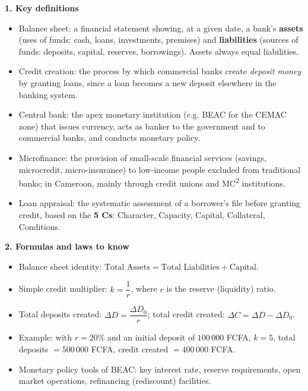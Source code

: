 \documentclass[11pt]{article}
\newcommand{\cle}[1]{{\popxbold\color{popdark}#1}}
\begin{document}
\begin{bilan}
\textbf{1. Key definitions}
\begin{itemize}
\item \cle{Balance sheet}: a financial statement showing, at a given date, a bank's \textbf{assets} (uses of funds: cash, loans, investments, premises) and \textbf{liabilities} (sources of funds: deposits, capital, reserves, borrowings). Assets always equal liabilities.
\item \cle{Credit creation}: the process by which commercial banks create \emph{deposit money} by granting loans, since a loan becomes a new deposit elsewhere in the banking system.
\item \cle{Central bank}: the apex monetary institution (e.g. \cle{BEAC} for the CEMAC zone) that issues currency, acts as banker to the government and to commercial banks, and conducts monetary policy.
\item \cle{Microfinance}: the provision of small-scale financial services (savings, microcredit, micro-insurance) to low-income people excluded from traditional banks; in Cameroon, mainly through \cle{credit unions} and MC\textsuperscript{2} institutions.
\item \cle{Loan appraisal}: the systematic assessment of a borrower's file before granting credit, based on the \textbf{5 Cs}: Character, Capacity, Capital, Collateral, Conditions.
\end{itemize}

\textbf{2. Formulas and laws to know}
\begin{itemize}
\item Balance sheet identity: $\text{Total Assets} = \text{Total Liabilities} + \text{Capital}$.
\item Simple credit multiplier: $k = \dfrac{1}{r}$, where $r$ is the reserve (liquidity) ratio.
\item Total deposits created: $\Delta D = \dfrac{\Delta D_0}{r}$; total credit created: $\Delta C = \Delta D - \Delta D_0$.
\item Example: with $r = 20\%$ and an initial deposit of $100\,000$ FCFA, $k = 5$, total deposits $= 500\,000$ FCFA, credit created $= 400\,000$ FCFA.
\item Monetary policy tools of BEAC: \cle{key interest rate}, \cle{reserve requirements}, \cle{open market operations}, refinancing (rediscount) facilities.
\end{itemize}


\end{bilan}
\end{document}
